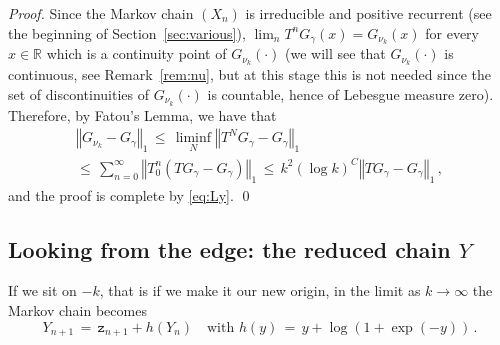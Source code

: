 \documentclass[reqno,11pt]{amsart}
\numberwithin{equation}{section}
\newtheorem{rem}[theorem]{Remark}
\renewcommand{\tilde}{\widetilde}
\newcommand{\cL}{{\ensuremath{\mathcal L}} }
\newcommand{\dd}{\,\text{\rm d}}             %
\newcommand{\bbR}{{\ensuremath{\mathbb R}} }
\newcommand{\logZ}{\mathtt{z}}
\begin{document}
\noindent 
\emph{Proof.} 
Since the Markov chain $(X_n)$ is irreducible and positive recurrent (see the beginning of Section~\ref{sec:various}), $\lim _n T^n  G_\gamma (x)=
G_{\nu_k}(x)$ for every $x \in \bbR$ which is a continuity point of $G_{\nu_k}(\cdot)$
 (we will see that 
$G_{\nu_k}(\cdot)$ is continuous, see Remark~\ref{rem:nu}, but at this stage this is not needed since 
the set of discontinuities of $G_{\nu_k}(\cdot)$ is countable, hence of Lebesgue measure zero). 
Therefore, by Fatou's Lemma, we have that 
\begin{multline}
\left \Vert G_{\nu_k} - G _ \gamma \right \Vert _1 \, \le 
\, \liminf _N \left \Vert T^N G_\gamma - G_\gamma \right\Vert_1
\\
 \le \, 
 \sum_{n =0}^\infty  \left \Vert T_0^n \left( T G_\gamma - G_\gamma\right) \right\Vert_1 \, \le \, k^2 \left( \log k \right)^C \left \Vert T G_\gamma - G_\gamma \right\Vert_1\, ,
\end{multline}
and the proof is complete by \eqref{eq:Ly}.
\qed

\medskip






\subsection{Looking from the edge: the reduced chain $Y$}
If we sit on $-k$, that is if we make it our new origin, in the limit as $k\to \infty$ the Markov chain becomes
\begin{equation}
\label{eq:iterY}
Y_{n+1}\, =\,  \logZ_{n+1} + h\left(Y_n \right)\ \ \ \text{ with } h(y)\, =\, y+ \log(1+\exp(-y))\, .
\end{equation}
\end{document}
